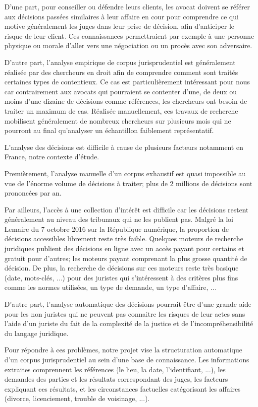 \documentclass[12pt,a4paper,oneside]{article}
\begin{document}
D'une part, pour conseiller ou défendre leurs clients, les avocat doivent se  référer aux décisions passées similaires à leur affaire en cour pour comprendre ce qui motive généralement les juges dans leur prise de décision, afin d'anticiper le risque de leur client. Ces connaissances permettraient par exemple à une personne physique ou morale d'aller vers une négociation ou un procès avec son adversaire. 

D'autre part, l'analyse empirique de corpus jurisprudentiel est généralement réalisée par des chercheurs en droit afin de comprendre comment sont traités certaines types de contentieux. Ce cas est particulièrement intéressant pour nous car contrairement aux avocats qui pourraient se contenter d'une, de deux ou moins d'une dizaine de décisions comme références, les chercheurs ont besoin de traiter un maximum de  cas. Réalisée manuellement, ces travaux de recherche mobilisent généralement de nombreux chercheurs sur plusieurs mois qui ne pourront au final qu'analyser un échantillon faiblement représentatif. 

L'analyse des décisions est difficile à cause de plusieurs facteurs notamment en France, notre contexte d'étude.

Premièrement, l'analyse manuelle d'un corpus exhaustif est quasi impossible au vue de l'énorme volume de décisions à traiter; plus de 2 millions de décisions sont prononcées par an. 

Par ailleurs,  l'accès à une collection d'intérêt est difficile car  les décisions restent généralement au niveau des tribunaux qui ne les publient pas. Malgré la loi Lemaire du 7 octobre 2016 sur la République numérique, la proportion de décisions accessibles librement reste très faible. Quelques moteurs de recherche juridiques publient des décisions en ligne avec un accès payant pour certains et gratuit pour d'autres; les moteurs payant comprenant la plus grosse quantité de décision. De plus, la recherche de décisions sur ces moteurs reste très basique (date, mots-clés, ...) pour des juristes qui s'intéressent à des critères plus fins comme les normes utilisées, un type de demande, un type d'affaire, ...

D'autre part, l'analyse automatique des décisions pourrait être d'une grande aide pour les non juristes qui ne peuvent pas connaitre les risques de leur actes sans l'aide d'un juriste du fait de la complexité de la justice et de l'incompréhensibilité du langage juridique.
%

Pour répondre à ces problèmes, notre projet vise la structuration automatique d'un corpus jurisprudentiel au sein d'une base de connaissance. Les informations extraites comprennent les références (le lieu, la date, l'identifiant, ...), les demandes des parties et les résultats correspondant des juges, les facteurs expliquant ces résultats, et les circonstances factuelles catégorisant les affaires (divorce, licenciement, trouble de voisinage, ...). 
\end{document}
